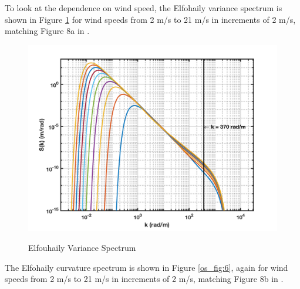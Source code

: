 To look at the dependence on wind speed, the Elfohaily variance spectrum is shown in Figure \ref{os_fig:5} for wind speeds from 2 m/s to 21 m/s in increments of 2 m/s, matching Figure 8a in \cite{elfouhaily}.

\begin{figure}[H]
  \begin{center}
\includegraphics[width=5in]{../media/elf_variance_spectrum.png}
  \end{center}
  \renewcommand{\baselinestretch}{1} \small\normalsize
  \begin{quote}
    \caption[Elfouhaily Variance Spectrum]{Elfouhaily Variance Spectrum\label{os_fig:5}}
  \end{quote}
\end{figure}
\renewcommand{\baselinestretch}{2} \small\normalsize

The Elfohaily curvature spectrum is shown in Figure \ref{os_fig:6}, again for wind speeds from 2 m/s to 21 m/s in increments of 2 m/s, matching Figure 8b in \cite{elfouhaily}.

